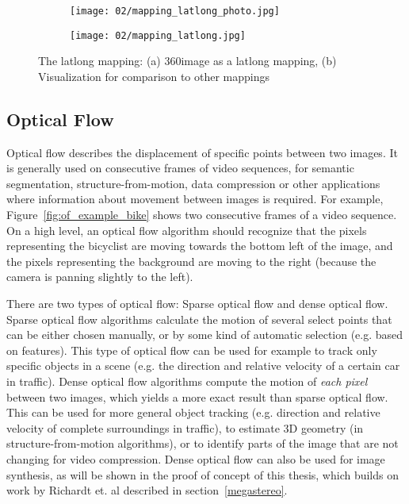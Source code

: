 \begin{figure}
    \quad
    \begin{subfigure}[b]{0.5\textwidth}            
            \centering
            \texttt{[image: 02/mapping\_latlong\_photo.jpg]}
            \caption{}
    \end{subfigure}%
    \begin{subfigure}[b]{0.5\textwidth}
            \centering
            \texttt{[image: 02/mapping\_latlong.jpg]}
            \caption{}
    \end{subfigure}
    \caption[Latlong mapping]{The latlong mapping: (a) 360\degree image as a latlong mapping, (b) Visualization for comparison to other mappings}\label{fig:latlong-intro}
  \end{figure}


\subsection{Optical Flow}

Optical flow describes the displacement of specific points between two images. It is generally used on consecutive frames of video sequences, for semantic segmentation, structure-from-motion, data compression or other applications where information about movement between images is required. For example, Figure~\ref{fig:of_example_bike} shows two consecutive frames of a video sequence. On a high level, an optical flow algorithm should recognize that the pixels representing the bicyclist are moving towards the bottom left of the image, and the pixels representing the background are moving to the right (because the camera is panning slightly to the left).

There are two types of optical flow: Sparse optical flow and dense optical flow. Sparse optical flow algorithms calculate the motion of several select points that can be either chosen manually, or by some kind of automatic selection (e.g. based on features). This type of optical flow can be used for example to track only specific objects in a scene (e.g. the direction and relative velocity of a certain car in traffic).
Dense optical flow algorithms compute the motion of \emph{each pixel} between two images, which yields a more exact result than sparse optical flow. This can be used for more general object tracking (e.g. direction and relative velocity of complete surroundings in traffic), to estimate 3D geometry (in structure-from-motion algorithms), or to identify parts of the image that are not changing for video compression. Dense optical flow can also be used for image synthesis, as will be shown in the proof of concept of this thesis, which builds on work by Richardt et. al \cite{megastereo} described in section~\ref{megastereo}.

